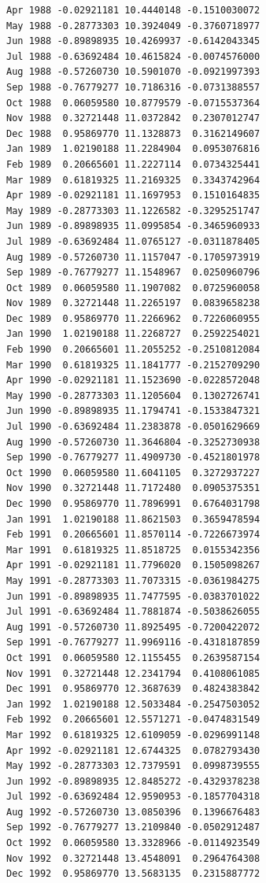 \documentclass[
  11pt,
  a4paper,
]{report}
\begin{document}
\begin{verbatim}
Apr 1988 -0.02921181 10.4440148 -0.1510030072
May 1988 -0.28773303 10.3924049 -0.3760718977
Jun 1988 -0.89898935 10.4269937 -0.6142043345
Jul 1988 -0.63692484 10.4615824 -0.0074576000
Aug 1988 -0.57260730 10.5901070 -0.0921997393
Sep 1988 -0.76779277 10.7186316 -0.0731388557
Oct 1988  0.06059580 10.8779579 -0.0715537364
Nov 1988  0.32721448 11.0372842  0.2307012747
Dec 1988  0.95869770 11.1328873  0.3162149607
Jan 1989  1.02190188 11.2284904  0.0953076816
Feb 1989  0.20665601 11.2227114  0.0734325441
Mar 1989  0.61819325 11.2169325  0.3343742964
Apr 1989 -0.02921181 11.1697953  0.1510164835
May 1989 -0.28773303 11.1226582 -0.3295251747
Jun 1989 -0.89898935 11.0995854 -0.3465960933
Jul 1989 -0.63692484 11.0765127 -0.0311878405
Aug 1989 -0.57260730 11.1157047 -0.1705973919
Sep 1989 -0.76779277 11.1548967  0.0250960796
Oct 1989  0.06059580 11.1907082  0.0725960058
Nov 1989  0.32721448 11.2265197  0.0839658238
Dec 1989  0.95869770 11.2266962  0.7226060955
Jan 1990  1.02190188 11.2268727  0.2592254021
Feb 1990  0.20665601 11.2055252 -0.2510812084
Mar 1990  0.61819325 11.1841777 -0.2152709290
Apr 1990 -0.02921181 11.1523690 -0.0228572048
May 1990 -0.28773303 11.1205604  0.1302726741
Jun 1990 -0.89898935 11.1794741 -0.1533847321
Jul 1990 -0.63692484 11.2383878 -0.0501629669
Aug 1990 -0.57260730 11.3646804 -0.3252730938
Sep 1990 -0.76779277 11.4909730 -0.4521801978
Oct 1990  0.06059580 11.6041105  0.3272937227
Nov 1990  0.32721448 11.7172480  0.0905375351
Dec 1990  0.95869770 11.7896991  0.6764031798
Jan 1991  1.02190188 11.8621503  0.3659478594
Feb 1991  0.20665601 11.8570114 -0.7226673974
Mar 1991  0.61819325 11.8518725  0.0155342356
Apr 1991 -0.02921181 11.7796020  0.1505098267
May 1991 -0.28773303 11.7073315 -0.0361984275
Jun 1991 -0.89898935 11.7477595 -0.0383701022
Jul 1991 -0.63692484 11.7881874 -0.5038626055
Aug 1991 -0.57260730 11.8925495 -0.7200422072
Sep 1991 -0.76779277 11.9969116 -0.4318187859
Oct 1991  0.06059580 12.1155455  0.2639587154
Nov 1991  0.32721448 12.2341794  0.4108061085
Dec 1991  0.95869770 12.3687639  0.4824383842
Jan 1992  1.02190188 12.5033484 -0.2547503052
Feb 1992  0.20665601 12.5571271 -0.0474831549
Mar 1992  0.61819325 12.6109059 -0.0296991148
Apr 1992 -0.02921181 12.6744325  0.0782793430
May 1992 -0.28773303 12.7379591  0.0998739555
Jun 1992 -0.89898935 12.8485272 -0.4329378238
Jul 1992 -0.63692484 12.9590953 -0.1857704318
Aug 1992 -0.57260730 13.0850396  0.1396676483
Sep 1992 -0.76779277 13.2109840 -0.0502912487
Oct 1992  0.06059580 13.3328966 -0.0114923549
Nov 1992  0.32721448 13.4548091  0.2964764308
Dec 1992  0.95869770 13.5683135  0.2315887772

\end{verbatim}
\end{document}
